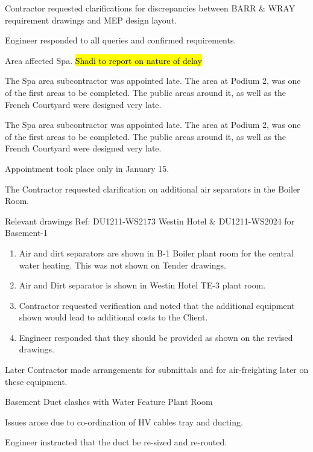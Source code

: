 %
 {
 \item Contractor requested clarifications for discrepancies between BARR \& WRAY requirement drawings and MEP design layout.
 \item Engineer responded to all queries and confirmed requirements.
 \item Area affected Spa. \delay \hl{Shadi to report on nature of delay}
 }{
 The Spa area subcontractor was appointed late. The area at Podium 2, was one of the first areas to be
 completed. The public areas around it, as well as the French Courtyard were designed very late.
 
 The Spa area subcontractor was appointed late. The area at Podium 2, was one of the first areas to be
 completed. The public areas around it, as well as the French Courtyard were designed very late.
}{
 Appointment took place only in January 15.
}

{
\item The Contractor requested clarification on additional air separators in the Boiler Room.
\item Relevant drawings Ref: DU1211-WS2173 Westin Hotel \& DU1211-WS2024 for Basement-1
   \begin{enumerate}
      \item Air and dirt separators are shown in B-1 Boiler plant room for the central water heating. This was not shown on Tender drawings.
      \item Air and Dirt separator is shown in Westin Hotel TE-3 plant room.
      \item Contractor requested verification and noted that the additional equipment shown would lead to additional costs to the Client.
      \item Engineer responded that they should be provided as shown on the revised drawings.
   \end{enumerate}
\item   Later Contractor made arrangements for submittals and for air-freighting later on these equipment. 
}{}{}

 {Basement Duct clashes with Water Feature Plant Room}
{
\item Issues arose due to co-ordination of HV cables tray and ducting.
\item Engineer instructed that the duct be re-sized and re-routed.
}{}{}

